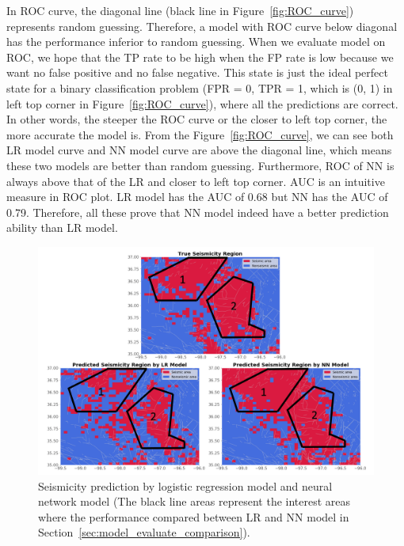 \documentclass[final-report]{report-template}
\begin{document}
In ROC curve, the diagonal line (black line in Figure~\ref{fig:ROC_curve}) represents random guessing. 
Therefore, a model with ROC curve below diagonal has the performance inferior to random guessing.
When we evaluate model on ROC, we hope that the TP rate to be high when the FP rate is low because we want no false positive and no false negative. This state is just the ideal perfect state for a binary classification problem (FPR = 0, TPR = 1, which is (0, 1) in left top corner in Figure~\ref{fig:ROC_curve}), where all the predictions are correct.
In other words, the steeper the ROC curve or the closer to left top corner, the more accurate the model is.
From the Figure~\ref{fig:ROC_curve}, we can see both LR model curve and NN model curve are above the diagonal line, which means these two models are better than random guessing.
Furthermore, ROC of NN is always above that of the LR and closer to left top corner. 
AUC is an intuitive measure in ROC plot. LR model has the AUC of 0.68 but NN has the AUC of 0.79. Therefore, all these prove that NN model indeed have a better prediction ability than LR model. 

\begin{figure}
    \begin{center}
        \includegraphics[width=1\textwidth]{mapping_comparison.png}
    \end{center}
    \caption{\label{fig:mapping_comparison} Seismicity prediction by logistic regression model and neural network model (The black line areas represent the interest areas where the performance compared between LR and NN model in Section~\ref{sec:model_evaluate_comparison}).}
\end{figure}
\end{document}
